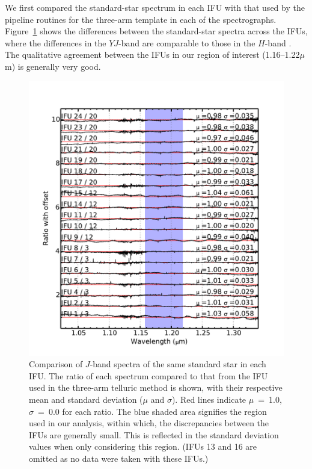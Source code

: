 We first compared the standard-star spectrum in each IFU with that used by the pipeline routines for the three-arm template in each of the spectrographs.
Figure~\ref{fig:IFU_compare} shows the differences between the standard-star spectra across the IFUs,
where the differences in the $YJ$-band are comparable to those in the $H$-band
\cite[cf. Fig.7 from][]{2013A&A...558A..56D}.
The qualitative agreement between the IFUs in our region of interest (1.16--1.22$\mu$m) is generally very good.


\begin{figure}
 \centering
 \begin{center}
 \includegraphics[width=12.0cm]{ngc6822/N6822_t_compare}
 \caption[Comparison of uniformity IFU spectra]{
    Comparison of $J$-band spectra of the same standard star in each IFU.
    The ratio of each spectrum compared to that from the IFU used in the three-arm telluric method is shown,
    with their respective mean and standard deviation ($\mu$ and $\sigma$).
    Red lines indicate $\mu$~=~1.0, $\sigma$~=~0.0 for each ratio.
    The blue shaded area signifies the region used in our analysis,
    within which, the discrepancies between the IFUs are generally small.
    This is reflected in the standard deviation values when only considering this region.
    (IFUs 13 and 16 are omitted as no data were taken with these IFUs.) \label{fig:IFU_compare}
          }
 \end{center}
\end{figure}

